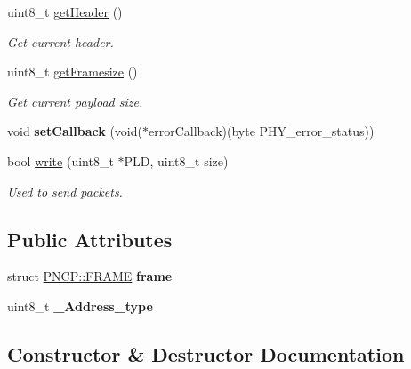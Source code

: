 \begin{DoxyCompactItemize}
uint8\+\_\+t \hyperlink{class_p_n_c_p_aa6e0bdee89e847ff9e055868d042c538}{get\+Header} ()
\begin{DoxyCompactList}\small\item\em Get current header. \end{DoxyCompactList}\item 
uint8\+\_\+t \hyperlink{class_p_n_c_p_aa0245863a56c402405025d73c4975607}{get\+Framesize} ()
\begin{DoxyCompactList}\small\item\em Get current payload size. \end{DoxyCompactList}\item 
\mbox{\label{class_p_n_c_p_a4cebd53315887f45d67036443687780d}} 
void {\bfseries set\+Callback} (void($\ast$error\+Callback)(byte P\+H\+Y\+\_\+error\+\_\+status))
\item 
bool \hyperlink{class_p_n_c_p_a510082b9d59deac16a6aa19a228c2cd7}{write} (uint8\+\_\+t $\ast$P\+LD, uint8\+\_\+t size)
\begin{DoxyCompactList}\small\item\em Used to send packets. \end{DoxyCompactList}\end{DoxyCompactItemize}
\subsection*{Public Attributes}
\begin{DoxyCompactItemize}
\item 
\mbox{\label{class_p_n_c_p_a758f566237d9cdc8f0e690e50d825888}} 
struct \hyperlink{struct_p_n_c_p_1_1_f_r_a_m_e}{P\+N\+C\+P\+::\+F\+R\+A\+ME} {\bfseries frame}
\item 
\mbox{\label{class_p_n_c_p_a897150ee7c23a8e7f57731d36612971e}} 
uint8\+\_\+t {\bfseries \+\_\+\+Address\+\_\+type}
\end{DoxyCompactItemize}


\subsection{Constructor \& Destructor Documentation}
\mbox{\label{class_p_n_c_p_ade922129d20c574d2a962f3ff0cd4ea3}} 

